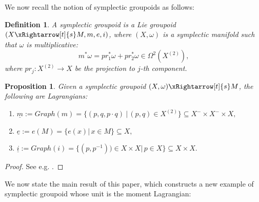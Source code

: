 \documentclass{amsart}
\newtheorem{prop}[theorem]{Proposition}
\newtheorem{defn}[theorem]{Definition}
\newtheorem{remark}[theorem]{Remark}
\numberwithin{equation}{section}
\begin{document}

We now recall the notion of symplectic groupoids as follows:

\begin{defn}\label{def:sympgroupoid}
A symplectic groupoid is a Lie groupoid
$(X \xRightarrow[t]{s} M, m, e, i)$, where $(X, \omega)$ is a symplectic manifold such that $\omega$ is multiplicative: 
\[
m^*\omega = pr_1^*\omega+ pr_2^*\omega \in \Omega^2(X^{(2)}),
\]
where $pr_j: X^{(2)} \rightarrow X$ be the projection to $j$-th component.
\end{defn}


\begin{prop} \label{lagrangiansubmanifold}
Given a symplectic groupoid $(X, \omega) \xRightarrow[t]{s} M$, the following are Lagrangians:
\begin{enumerate}
\item $\underline{m} := Graph(m) = \{(p,q,p\cdot q) \ |\,  (p,q)\in X^{(2)}\} \subseteq X^- \times X^- \times X,$
\item $\underline{e} := e(M)=\{e(x) |\,  x\in M\} \subseteq X,$
\item $\underline{i} := Graph(i) =\{(p,p^{-1})) \in X \times X|\,  p\in X \}\subseteq X \times X.$ 
\end{enumerate}
\end{prop} 

\begin{proof}
See e.g. \cite[Prop. 14.9]{CFM}.
\end{proof}

We now state the main result of this paper, which constructs a new example of symplectic groupoid whose unit is the moment Lagrangian:
\end{document}
